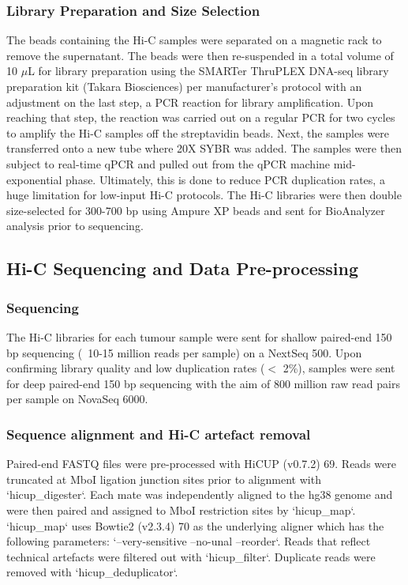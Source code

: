 \subsubsection{Library Preparation and Size Selection}

The beads containing the Hi-C samples were separated on a magnetic rack to remove the supernatant.
The beads were then re-suspended in a total volume of 10 $\mu$L for library preparation using the SMARTer ThruPLEX DNA-seq library preparation kit (Takara Biosciences) per manufacturer's protocol with an adjustment on the last step, a PCR reaction for library amplification.
Upon reaching that step, the reaction was carried out on a regular PCR for two cycles to amplify the Hi-C samples off the streptavidin beads.
Next, the samples were transferred onto a new tube where 20X SYBR was added.
The samples were then subject to real-time qPCR and pulled out from the qPCR machine mid-exponential phase.
Ultimately, this is done to reduce PCR duplication rates, a huge limitation for low-input Hi-C protocols.
The Hi-C libraries were then double size-selected for 300-700 bp using Ampure XP beads and sent for BioAnalyzer analysis prior to sequencing.

\subsection{Hi-C Sequencing and Data Pre-processing}

\subsubsection{Sequencing}

The Hi-C libraries for each tumour sample were sent for shallow paired-end 150 bp sequencing (~10-15 million reads per sample) on a NextSeq 500.
Upon confirming library quality and low duplication rates ($<$ 2\%), samples were sent for deep paired-end 150 bp sequencing with the aim of 800 million raw read pairs per sample on NovaSeq 6000.

\subsubsection{Sequence alignment and Hi-C artefact removal}

Paired-end FASTQ files were pre-processed with HiCUP (v0.7.2) 69.
Reads were truncated at MboI ligation junction sites prior to alignment with `hicup_digester`.
Each mate was independently aligned to the hg38 genome and were then paired and assigned to MboI restriction sites by `hicup_map`.
`hicup_map` uses Bowtie2 (v2.3.4) 70 as the underlying aligner which has the following parameters: `--very-sensitive --no-unal --reorder`.
Reads that reflect technical artefacts were filtered out with `hicup_filter`.
Duplicate reads were removed with `hicup_deduplicator`.

